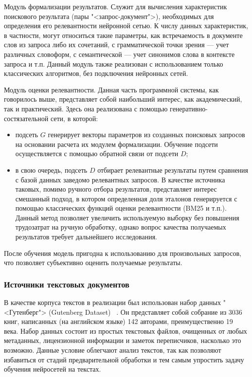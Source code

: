 Модуль формализации результатов. Служит для вычисления характеристик поискового результата (пары "<запрос-документ">), необходимых для определения его 
релевантности нейронной сетью. К числу данных характеристик, в частности, могут относиться такие параметры, как встречаемость в документе слов из запроса
либо их сочетаний, с грамматической точки зрения --- учет различных словоформ, с семантической --- учет синонимов слова в контексте запроса и т.п.
Данный модуль также реализован с использованием только классических алгоритмов, без подключения нейронных сетей.

Модуль оценки релевантности. Данная часть программной системы, как говорилось выше, представляет собой наибольший интерес, как академический, так
и практический. Здесь она реализована с помощью генеративно-состязательной сети, в которой:
\begin{itemize}
\item подсеть $G$ генерирует векторы параметров из созданных поисковых запросов на основании расчета их модулем формализации. Обучение подсети осуществляется
с помощью обратной связи от подсети $D$;
\item в свою очередь, подсеть $D$ отбирает релевантные результаты путем сравнения с базой данных заведомо релевантных запросов. В качестве источника таковых,
помимо ручного отбора результатов, представляет интерес смешанный подход, в котором определенная доля эталонов генерируется с помощью классических функций
оценки релевантности (BM25 и т.п.). Данный метод позволяет увеличить используемую выборку без повышения трудозатрат на ручную обработку, однако вопрос
качества получаемых результатов требует дальнейшего исследования.
\end{itemize}
После обучения модель пригодна к использованию для произвольных запросов, что позволяет субъективно оценить получаемые результаты.

\subsubsection{Источники текстовых документов}
В качестве корпуса текстов в реализации был использован набор данных "<Гутенберг"> (Gutenberg Dataset) ~\cite{lahiri:2014:SRW}. 
Он представляет собой собрание из 3036 книг, написанных (на английском языке) 142 авторами, преимущественно 19 века. 
Набор данных состоит из простых текстовых файлов, очищенных от любых метаданных, лицензионной информации и заметок переписчиков, 
насколько это возможно. Данные условие облегчают анализ текстов, так как позволяют избавиться от стадий предварительной обработки
и тем самым упростить задачу обучения нейросетей на текстах.


